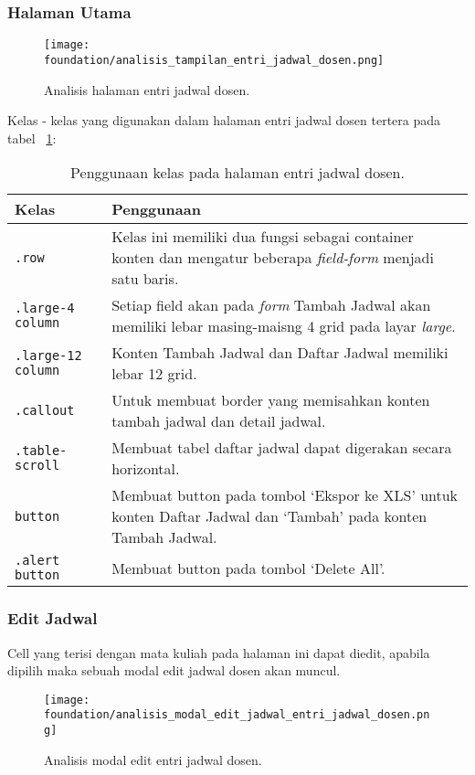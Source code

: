 \subsubsection{Halaman Utama}
\begin{figure} [H]
	\centering  
	\texttt{[image: foundation/analisis\_tampilan\_entri\_jadwal\_dosen.png]}
	\caption{Analisis halaman entri jadwal dosen.}
	\label{fig:analisisEntriJadwalDosen}
\end{figure}
Kelas - kelas yang digunakan dalam halaman entri jadwal dosen tertera pada tabel ~\ref{table:analisisEntriJadwalDosen}:
\begin{table}[H]
	\centering
	\caption{Penggunaan kelas pada halaman entri jadwal dosen.}
	\begin{tabularx}{\textwidth}{lX}
		\toprule
		Kelas     & Penggunaan \\
		\midrule
		\texttt{.row} & Kelas ini memiliki dua fungsi sebagai container konten dan mengatur beberapa \textit{field-form} menjadi satu baris. \\
		\texttt{.large-4 column} & Setiap field akan pada \textit{form} Tambah Jadwal akan memiliki lebar masing-maisng 4 grid pada layar \textit{large}.\\
		\texttt{.large-12 column} & Konten Tambah Jadwal dan Daftar Jadwal memiliki lebar 12 grid.\\
		\texttt{.callout} & Untuk membuat border yang memisahkan konten tambah jadwal dan detail jadwal.\\
		\texttt{.table-scroll} & Membuat tabel daftar jadwal dapat digerakan secara horizontal.\\
		\texttt{button} & Membuat button pada tombol `Ekspor ke XLS' untuk konten Daftar Jadwal dan `Tambah' pada konten Tambah Jadwal.\\
		\texttt{.alert button} & Membuat button pada tombol `Delete All'.\\
		\bottomrule
	\end{tabularx}%
	\label{table:analisisEntriJadwalDosen}
\end{table}

\subsubsection{Edit Jadwal}
Cell yang terisi dengan mata kuliah pada halaman ini dapat diedit, apabila dipilih maka sebuah modal edit jadwal dosen akan muncul. 
\begin{figure} [H]
	\centering  
	\texttt{[image: foundation/analisis\_modal\_edit\_jadwal\_entri\_jadwal\_dosen.png]}
	\caption{Analisis modal edit entri jadwal dosen.}
	\label{table:analisisEditEntriJadwalDosen}
\end{figure}


